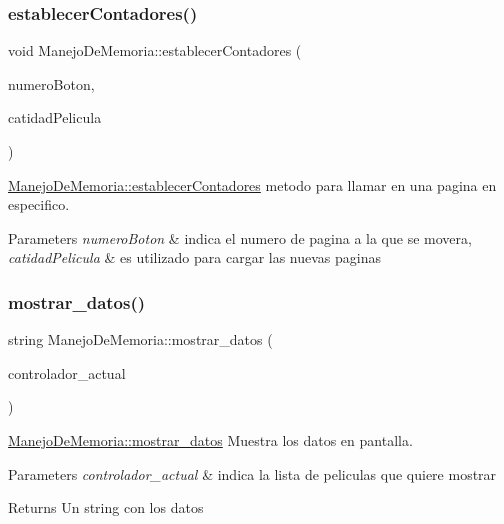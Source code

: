 \subsubsection{\texorpdfstring{establecer\+Contadores()}{establecerContadores()}}
{\footnotesize\ttfamily void Manejo\+De\+Memoria\+::establecer\+Contadores (\begin{DoxyParamCaption}\item[{int}]{numero\+Boton,  }\item[{int}]{catidad\+Pelicula }\end{DoxyParamCaption})}



\hyperlink{classManejoDeMemoria_a2d4239a7776d1588548a39dc1b1a7807}{Manejo\+De\+Memoria\+::establecer\+Contadores} metodo para llamar en una pagina en especifico. 


\begin{DoxyParams}{Parameters}
{\em numero\+Boton} & indica el numero de pagina a la que se movera, \\
\hline
{\em catidad\+Pelicula} & es utilizado para cargar las nuevas paginas \\
\hline
\end{DoxyParams}
\mbox{\label{classManejoDeMemoria_a38d5e04bb74cb2f51ba1cb13d98a368a}} 
\subsubsection{\texorpdfstring{mostrar\+\_\+datos()}{mostrar\_datos()}}
{\footnotesize\ttfamily string Manejo\+De\+Memoria\+::mostrar\+\_\+datos (\begin{DoxyParamCaption}\item[{\hyperlink{classLinkedMovie}{Linked\+Movie} $\ast$}]{controlador\+\_\+actual }\end{DoxyParamCaption})}



\hyperlink{classManejoDeMemoria_a38d5e04bb74cb2f51ba1cb13d98a368a}{Manejo\+De\+Memoria\+::mostrar\+\_\+datos} Muestra los datos en pantalla. 


\begin{DoxyParams}{Parameters}
{\em controlador\+\_\+actual} & indica la lista de peliculas que quiere mostrar \\
\hline
\end{DoxyParams}
\begin{DoxyReturn}{Returns}
Un string con los datos 
\end{DoxyReturn}
\mbox{\label{classManejoDeMemoria_a867d2a0b738d0a3c1635517166928ec8}} 
